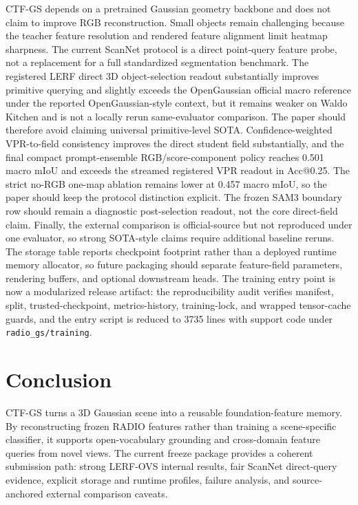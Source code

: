 \documentclass[10pt,twocolumn,letterpaper]{article}
\newcommand{\method}{CTF-GS}
\begin{document}
\method{} depends on a pretrained Gaussian geometry backbone and does not claim
to improve RGB reconstruction. Small objects remain challenging because the
teacher feature resolution and rendered feature alignment limit heatmap
sharpness. The current ScanNet protocol is a direct point-query feature probe,
not a replacement for a full standardized segmentation benchmark. The registered
LERF direct 3D object-selection readout substantially improves primitive querying
and slightly exceeds the OpenGaussian official macro reference under the reported
OpenGaussian-style context, but it remains weaker on Waldo Kitchen and is not a
locally rerun same-evaluator comparison. The paper should therefore avoid
claiming universal primitive-level SOTA. Confidence-weighted VPR-to-field
consistency improves the direct student field substantially, and the final
compact prompt-ensemble RGB/score-component policy reaches 0.501 macro mIoU and exceeds
the streamed registered VPR readout in Acc@0.25. The strict no-RGB one-map
ablation remains lower at 0.457 macro mIoU, so the paper should keep the
protocol distinction explicit. The frozen SAM3
boundary row should remain a diagnostic post-selection readout, not the core
direct-field claim. Finally,
the external comparison is official-source but not reproduced under one evaluator, so
strong SOTA-style claims require additional baseline reruns. The storage table
reports checkpoint footprint rather than a deployed runtime memory allocator, so
future packaging should separate feature-field parameters, rendering buffers, and
optional downstream heads.
The training entry point is now a modularized release artifact: the
reproducibility audit verifies manifest, split, trusted-checkpoint,
metrics-history, training-lock, and wrapped tensor-cache guards, and the
entry script is reduced to 3735 lines with support code under
\texttt{radio\_gs/training}.

\section{Conclusion}

\method{} turns a 3D Gaussian scene into a reusable foundation-feature memory.
By reconstructing frozen RADIO features rather than training a scene-specific
classifier, it supports open-vocabulary grounding and cross-domain feature
queries from novel views. The current freeze package provides a coherent
submission path: strong LERF-OVS internal results, fair ScanNet direct-query
evidence, explicit storage and runtime profiles, failure analysis, and
source-anchored external comparison caveats.



\end{document}
